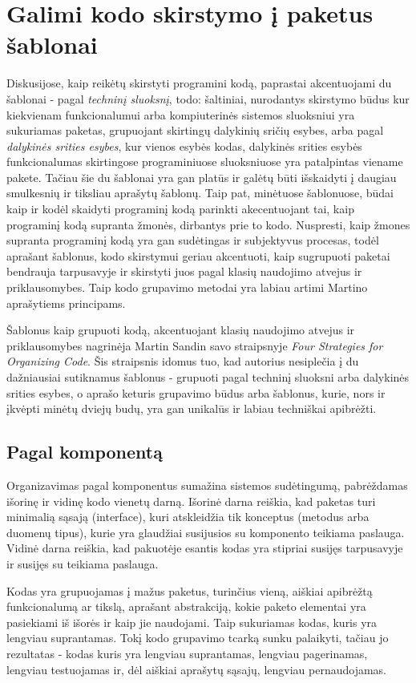 \section{Galimi kodo skirstymo į paketus šablonai}
Diskusijose, kaip reikėtų skirstyti programini kodą, paprastai akcentuojami du šablonai - pagal \textit{techninį sluoksnį}, todo: šaltiniai, nurodantys skirstymo būdus
kur kiekvienam funkcionalumui arba kompiuterinės sistemos sluoksniui yra sukuriamas paketas,
grupuojant skirtingų dalykinių sričių esybes, arba pagal \textit{dalykinės srities esybes}, kur vienos esybės kodas, dalykinės srities
esybės funkcionalumas skirtingose programiniuose sluoksniuose yra patalpintas viename pakete.
Tačiau šie du šablonai yra gan platūs ir galėtų būti išskaidyti į daugiau smulkesnių ir tiksliau aprašytų šablonų.
Taip pat, minėtuose šablonuose, būdai kaip ir kodėl skaidyti programinį kodą parinkti akecentuojant tai, kaip programinį
kodą supranta žmonės, dirbantys prie to kodo.
Nuspresti, kaip žmones supranta programinį kodą yra gan sudėtingas ir subjektyvus procesas, todėl aprašant šablonus, kodo skirstymui
geriau akcentuoti, kaip sugrupuoti paketai bendrauja tarpusavyje ir skirstyti juos pagal klasių naudojimo atvejus ir priklausomybes.
Taip kodo grupavimo metodai yra labiau artimi Martino aprašytiems principams.


Šablonus kaip grupuoti kodą, akcentuojant klasių naudojimo atvejus ir priklausomybes nagrinėja Martin Sandin savo
straipsnyje \textit{Four Strategies for Organizing Code}.
Šis straipsnis idomus tuo, kad autorius nesiplečia į du dažniausiai sutiknamus šablonus - grupuoti pagal techninį sluoksni arba dalykinės srities esybes,
o aprašo keturis grupavimo būdus arba šablonus, kurie, nors ir įkvėpti minėtų dviejų budų, yra gan unikalūs ir labiau techniškai apibrėžti.
\subsection{Pagal komponentą}
Organizavimas pagal komponentus sumažina sistemos sudėtingumą, pabrėždamas išorinę ir vidinę kodo vienetų darną.
Išorinė darna reiškia, kad paketas turi minimalią sąsają \angl(interface), kuri atskleidžia tik konceptus (metodus arba duomenų tipus),
kurie yra glaudžiai susijusios su komponento teikiama paslauga.
Vidinė darna reiškia, kad pakuotėje esantis kodas yra stipriai susijęs tarpusavyje ir susijęs su teikiama paslauga.

Kodas yra grupuojamas į mažus paketus, turinčius vieną, aiškiai apibrėžtą funkcionalumą ar tikslą, aprašant abstrakciją, kokie paketo elementai
yra pasiekiami iš išorės ir kaip jie naudojami.
Taip sukuriamas kodas, kuris yra lengviau suprantamas.
Tokį kodo grupavimo tcarką sunku palaikyti, tačiau jo rezultatas - kodas kuris yra lengviau suprantamas, lengviau pagerinamas, lengviau testuojamas
ir, dėl aiškiai aprašytų sąsajų, lengviau pernaudojamas.

